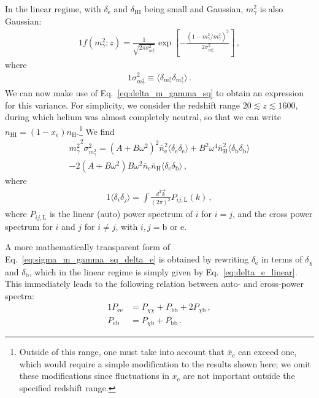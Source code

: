 \documentclass[prd,aps,10pt,nofootinbib,twocolumn,superscriptaddress,preprintnumbers,balancelastpage,longbibliography]{revtex4-1}
\begin{document}
In the linear regime, with $\delta_\text{e}$ and $\delta_\text{HI}$ being small and Gaussian, $m_\gamma^2$ is also Gaussian:
%
\begin{alignat}{1}
    f(m_\gamma^2;z) = \frac{1}{\sqrt{2\pi \sigma_{m_\gamma^2}^2}} \exp \left[-\frac{(1 - m_\gamma^2/\overline{m_\gamma^2})^2}{2 \sigma_{m_\gamma^2}^2}\right] \,,
\end{alignat}
%
where
%
\begin{alignat}{1}
    \sigma^2_{m_\gamma^2} \equiv \langle \delta_{m_\gamma^2} \delta_{m_\gamma^2} \rangle \,.
\end{alignat}
%
We can now make use of Eq.~\eqref{eq:delta_m_gamma_sq} to obtain an expression for this variance. For simplicity, we consider the redshift range $20 \lesssim z \lesssim 1600$, during which helium was almost completely neutral, so that we can write $n_\text{HI} = (1 - x_\text{e})n_\text{H}$.\footnote{Outside of this range, one must take into account that $\overline{x}_\text{e}$ can exceed one, which would require a simple modification to the results shown here; we omit these modifications since fluctuations in $x_\text{e}$ are not important outside the specified redshift range.} We find
%
\begin{multline}
    \overline{m_\gamma^2}^2 \sigma^2_{m_\gamma^2} = (A + B\omega^2)^2 \overline{n}_\text{e}^2 \langle \delta_\text{e} \delta_\text{e} \rangle + B^2 \omega^4 \overline{n}_\text{H}^2 \langle \delta_\text{b} \delta_\text{b} \rangle \\
    - 2 (A + B \omega^2) B \omega^2 \overline{n}_\text{e} \overline{n}_\text{H} \langle \delta_\text{e} \delta_\text{b} \rangle \,,
    \label{eq:sigma_m_gamma_sq_delta_e}
\end{multline}
%
where
%
\begin{alignat}{1}
    \langle \delta_i \delta_j \rangle = \int \frac{d^3 \vec{k}}{(2\pi)^3} P_{ij,\text{L}} (k) \,,
\end{alignat}
%
where $P_{ij,\text{L}}$ is the linear (auto) power spectrum of $i$ for $i=j$, and the cross power spectrum for $i$ and $j$ for $i \neq j$, with $i,j = \text{b}$ or $\text{e}$. 

A more mathematically transparent form of Eq.~\eqref{eq:sigma_m_gamma_sq_delta_e} is obtained by rewriting $\delta_\text{e}$ in terms of $\delta_\chi$ and $\delta_\text{b}$, which in the linear regime is simply given by Eq.~\eqref{eq:delta_e_linear}. 
This immediately leads to the following relation between auto- and cross-power spectra: 
%
\begin{alignat}{1}
    P_\text{ee} &= P_{\chi \chi} + P_\text{bb} + 2 P_{\chi \text{b}} \,, \\
    P_\text{eb} &= P_{\chi \text{b}} + P_\text{bb} \,.
\end{alignat}
\end{document}
